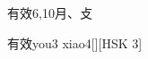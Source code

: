 \begin{entry}{有效}{6,10}{⽉、⽁}
  \begin{phonetics}{有效}{you3 xiao4}[][HSK 3]
  \end{phonetics}
\end{entry}
